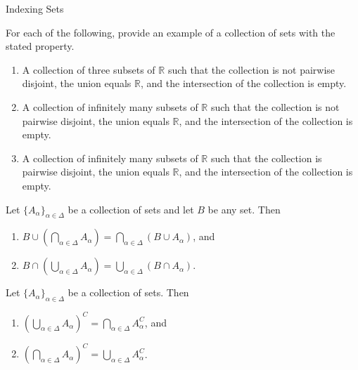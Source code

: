 \begin{section}{Indexing Sets}

\begin{problem}
For each of the following, provide an example of a collection of sets with the stated property.
\begin{enumerate}[label=\textrm{(\alph*)}]
\item A collection of three subsets of $\mathbb{R}$ such that the collection is not pairwise disjoint, the union equals $\mathbb{R}$, and the intersection of the collection is empty.
\item A collection of infinitely many subsets of $\mathbb{R}$ such that the collection is not pairwise disjoint, the union equals $\mathbb{R}$, and the intersection of the collection is empty.
\item A collection of infinitely many subsets of $\mathbb{R}$ such that the collection is pairwise disjoint, the union equals $\mathbb{R}$, and the intersection of the collection is empty.
\end{enumerate}
\end{problem}



\begin{theorem}
Let $\{A_{\alpha}\}_{\alpha\in\Delta}$ be a collection of sets and let $B$ be any set.  Then
\begin{enumerate}[label=\textrm{(\alph*)}]
\item $\displaystyle B \cup \left(\bigcap_{\alpha\in\Delta}A_{\alpha}\right)=\bigcap_{\alpha\in\Delta}(B\cup A_{\alpha})$, and
\item $\displaystyle B \cap \left(\bigcup_{\alpha\in\Delta}A_{\alpha}\right)=\bigcup_{\alpha\in\Delta}(B\cap A_{\alpha})$.
\end{enumerate}
\end{theorem}

\begin{theorem}
Let $\{A_{\alpha}\}_{\alpha\in\Delta}$ be a collection of sets.  Then
\begin{enumerate}[label=\textrm{(\alph*)}]
\item $\displaystyle \left(\bigcup_{\alpha\in\Delta} A_{\alpha}\right)^C=\bigcap_{\alpha\in\Delta}A_{\alpha}^{C}$, and
\item $\displaystyle \left(\bigcap_{\alpha\in\Delta} A_{\alpha}\right)^C=\bigcup_{\alpha\in\Delta}A_{\alpha}^{C}$.
\end{enumerate}
\end{theorem}


\end{section}
